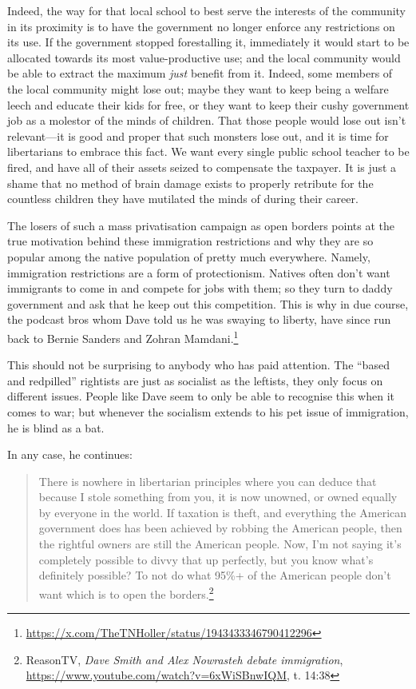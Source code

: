 \documentclass[11pt]{article}
\begin{document}
Indeed, the way for that local school to best serve the interests of the community in its proximity is to have the government no longer enforce any restrictions on its use. If the government stopped forestalling it, immediately it would start to be allocated towards its most value-productive use; and the local community would be able to extract the maximum \emph{just} benefit from it. Indeed, some members of the local community might lose out; maybe they want to keep being a welfare leech and educate their kids for free, or they want to keep their cushy government job as a molestor of the minds of children. That those people would lose out isn't relevant---it is good and proper that such monsters lose out, and it is time for libertarians to embrace this fact. We want every single public school teacher to be fired, and have all of their assets seized to compensate the taxpayer. It is just a shame that no method of brain damage exists to properly retribute for the countless children they have mutilated the minds of during their career.

The losers of such a mass privatisation campaign as open borders points at the true motivation behind these immigration restrictions and why they are so popular among the native population of pretty much everywhere. Namely, immigration restrictions are a form of protectionism. Natives often don't want immigrants to come in and compete for jobs with them; so they turn to daddy government and ask that he keep out this competition. This is why in due course, the podcast bros whom Dave told us he was swaying to liberty, have since run back to Bernie Sanders and Zohran Mamdani.\footnote{\url{https://x.com/TheTNHoller/status/1943433346790412296}}

This should not be surprising to anybody who has paid attention. The ``based and redpilled'' rightists are just as socialist as the leftists, they only focus on different issues. People like Dave seem to only be able to recognise this when it comes to war; but whenever the socialism extends to his pet issue of immigration, he is blind as a bat.

In any case, he continues:
\begin{quote}
There is nowhere in libertarian principles where you can deduce that because I stole something from you, it is now unowned, or owned equally by everyone in the world. If taxation is theft, and everything the American government does has been achieved by robbing the American people, then the rightful owners are still the American people. Now, I'm not saying it's completely possible to divvy that up perfectly, but you know what's definitely possible? To not do what 95\%+ of the American people don't want which is to open the borders.\footnote{ReasonTV, \emph{Dave Smith and Alex Nowrasteh debate immigration}, \url{https://www.youtube.com/watch?v=6xWiSBnwIQM}, t. 14:38}
\end{quote}
\end{document}
